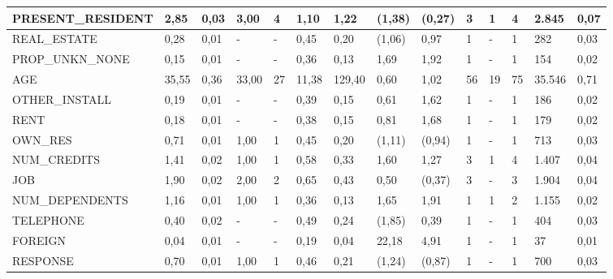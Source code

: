 \begin{table}[]
\begin{tabular}{|p{2.6cm}|p{0.75cm}|p{0.6cm}|p{0.75cm}|p{0.6cm}|p{0.75cm}|p{1.2cm}|p{0.6cm}|p{0.65cm}|p{0.7cm}|p{0.45cm}|p{0.65cm}|p{0.85cm}|p{0.55cm}|}
		{\tiny PRESENT\_RESIDENT}
		&{\tiny 2,85}&{\tiny 0,03}&{\tiny 3,00}&{\tiny 4}
		&{\tiny 1,10}&{\tiny 1,22}&{\tiny (1,38)}&{\tiny (0,27)}
		&{\tiny 3}&{\tiny 1}&{\tiny 4}&{\tiny 2.845}&{\tiny 0,07}\\ \hline
		{\tiny REAL\_ESTATE}
		&{\tiny 0,28}&{\tiny 0,01}&{\tiny -}&{\tiny -}
		&{\tiny 0,45}&{\tiny 0,20}&{\tiny (1,06)}&{\tiny 0,97}
		&{\tiny 1}&{\tiny -}&{\tiny 1}&{\tiny 282}& {\tiny 0,03}\\ \hline
		{\tiny PROP\_UNKN\_NONE}
		&{\tiny 0,15}&{\tiny 0,01}&{\tiny -}&{\tiny -}
		&{\tiny 0,36}&{\tiny 0,13}&{\tiny 1,69}&{\tiny 1,92}
		&{\tiny 1}&{\tiny -}&{\tiny 1}&{\tiny 154}&{\tiny 0,02}\\ \hline
		{\tiny AGE}
		&{\tiny 35,55}&{\tiny 0,36}&{\tiny 33,00}&{\tiny 27}
		&{\tiny 11,38}&{\tiny 129,40}&{\tiny 0,60}&{\tiny 1,02}
		&{\tiny 56}&{\tiny 19}&{\tiny 75}&{\tiny 35.546}&{\tiny 0,71}\\ \hline
		{\tiny OTHER\_INSTALL}
		&{\tiny 0,19}&{\tiny 0,01}&{\tiny -}&{\tiny -}
		&{\tiny 0,39}&{\tiny 0,15}&{\tiny 0,61}&{\tiny 1,62}
		&{\tiny 1}&{\tiny -}&{\tiny 1}&{\tiny 186}&{\tiny 0,02}\\ \hline
		{\tiny RENT}
		&{\tiny 0,18}&{\tiny 0,01}&{\tiny -}&{\tiny -}
		&{\tiny 0,38}&{\tiny 0,15}&{\tiny 0,81}&{\tiny 1,68}
		&{\tiny 1}&{\tiny -}&{\tiny 1}&{\tiny 179}&{\tiny 0,02}\\ \hline
		{\tiny OWN\_RES}
		&{\tiny 0,71}&{\tiny 0,01}&{\tiny 1,00}&{\tiny 1}
		&{\tiny 0,45}&{\tiny 0,20}&{\tiny (1,11)}&{\tiny (0,94)}
		&{\tiny 1}&{\tiny -}&{\tiny 1}&{\tiny 713}&{\tiny 0,03}\\ \hline
		{\tiny NUM\_CREDITS}
		&{\tiny 1,41}&{\tiny 0,02}&{\tiny 1,00}&{\tiny 1}
		&{\tiny 0,58}&{\tiny 0,33}&{\tiny 1,60}&{\tiny 1,27}&
		{\tiny 3}&{\tiny 1}&{\tiny 4}&{\tiny 1.407}&{\tiny 0,04}\\ \hline
		{\tiny JOB}
		&{\tiny 1,90}&{\tiny 0,02}&{\tiny 2,00}&{\tiny 2}
		&{\tiny 0,65}&{\tiny 0,43}&{\tiny 0,50}&{\tiny (0,37)}
		&{\tiny 3}&{\tiny -}&{\tiny 3}&{\tiny  1.904}&{\tiny 0,04}\\ \hline
		{\tiny NUM\_DEPENDENTS}
		&{\tiny 1,16}&{\tiny 0,01}&{\tiny 1,00}&{\tiny 1}
		&{\tiny 0,36}&{\tiny 0,13}&{\tiny 1,65}&{\tiny 1,91}
		&{\tiny 1}&{\tiny 1}&{\tiny 2}&{\tiny 1.155}&{\tiny 0,02}\\ \hline
		{\tiny TELEPHONE}
		&{\tiny 0,40}&{\tiny 0,02}&{\tiny -}&{\tiny -}
		&{\tiny 0,49}&{\tiny 0,24}&{\tiny (1,85)}&{\tiny 0,39}
		&{\tiny 1}&{\tiny -}&{\tiny 1}&{\tiny 404}&{\tiny 0,03}\\ \hline
		{\tiny FOREIGN }
		&{\tiny 0,04}&{\tiny 0,01}&{\tiny -}&{\tiny -}
		&{\tiny 0,19}&{\tiny 0,04}&{\tiny 22,18}&{\tiny 4,91}
		&{\tiny 1}&{\tiny -}&{\tiny 1}&{\tiny 37}&{\tiny 0,01 }\\ \hline
		{\tiny RESPONSE}
		&{\tiny 0,70}&{\tiny 0,01}&{\tiny 1,00}&{\tiny 1}
		&{\tiny 0,46}&{\tiny 0,21}&{\tiny (1,24)}&{\tiny (0,87)}
		&{\tiny 1}&{\tiny -}&{\tiny 1}&{\tiny 700}&{\tiny 0,03}\\ \hline            
	\end{tabular}
\end{table}